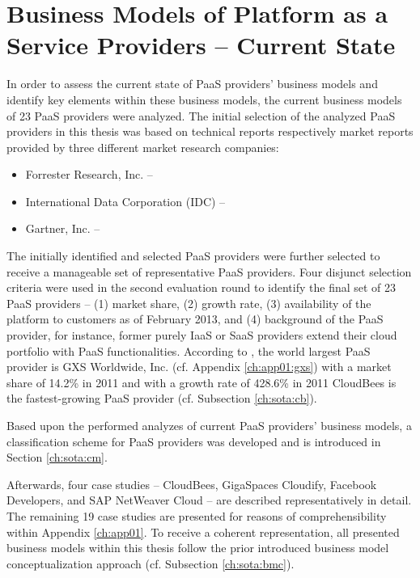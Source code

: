 \chapter{Business Models of Platform as a Service Providers -- Current State}\label{ch:sota}

In order to assess the current state of \ac{PaaS} providers' business models and identify key elements within these business models, the current business models of 23 \ac{PaaS} providers were analyzed. The initial selection of the analyzed \ac{PaaS} providers in this thesis was based on technical reports respectively market reports provided by three different market research companies:
\begin{itemize}
	\item Forrester Research, Inc. -- \citet{Ried2011a,Rymer2011}
	\item International Data Corporation (IDC) -- \citet{Bradshaw2012,Hendrick2012, Hendrick2012a}
	\item Gartner, Inc. -- \citet{Smith2012}
\end{itemize}
The initially identified and selected \ac{PaaS} providers were further selected to receive a manageable set of representative \ac{PaaS} providers. Four disjunct selection criteria were used in the second evaluation round to identify the final set of 23 \ac{PaaS} providers -- (1) market share, (2) growth rate, (3) availability of the platform to customers as of February 2013, and (4) background of the \ac{PaaS} provider, for instance, former purely \ac{IaaS} or \ac{SaaS} providers extend their cloud portfolio with \ac{PaaS} functionalities. According to \citet{Hendrick2012}, the world largest \ac{PaaS} provider is GXS Worldwide, Inc. (cf. Appendix \ref{ch:app01:gxs}) with a market share of 14.2\% in 2011 and with a growth rate of 428.6\% in 2011 CloudBees  is the fastest-growing \ac{PaaS} provider (cf. Subsection \ref{ch:sota:cb}).

Based upon the performed analyzes of current \ac{PaaS} providers' business models, a classification scheme for \ac{PaaS} providers was developed and is introduced in Section \ref{ch:sota:cm}.

Afterwards, four case studies -- CloudBees, GigaSpaces Cloudify, Facebook Developers, and SAP NetWeaver Cloud -- are described representatively in detail. The remaining 19 case studies are presented for reasons of comprehensibility within Appendix \ref{ch:app01}. To receive a coherent representation, all presented business models within this thesis follow the prior introduced business model conceptualization approach (cf. Subsection \ref{ch:sota:bmc}).

